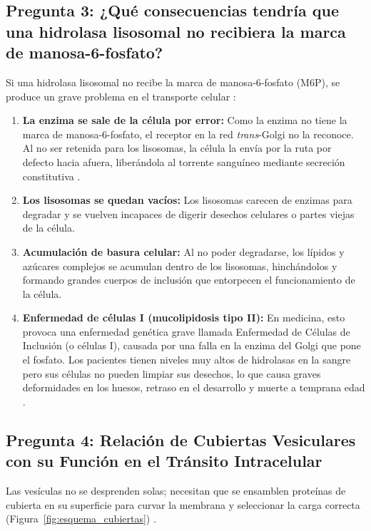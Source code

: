\documentclass[spanish,letterpaper,oneside]{article}
\begin{document}
\subsection{Pregunta 3: ¿Qué consecuencias tendría que una hidrolasa lisosomal no recibiera la marca de manosa-6-fosfato?}
Si una hidrolasa lisosomal no recibe la marca de manosa-6-fosfato (M6P), se produce un grave problema en el transporte celular \parencite{lieberman2018marks, karp2019biologia}:
\begin{enumerate}
    \item \textbf{La enzima se sale de la célula por error:} Como la enzima no tiene la marca de manosa-6-fosfato, el receptor en la red \textit{trans}-Golgi no la reconoce. Al no ser retenida para los lisosomas, la célula la envía por la ruta por defecto hacia afuera, liberándola al torrente sanguíneo mediante secreción constitutiva \parencite{alberts2022molecular, lodish2021molecular}.
    \item \textbf{Los lisosomas se quedan vacíos:} Los lisosomas carecen de enzimas para degradar y se vuelven incapaces de digerir desechos celulares o partes viejas de la célula.
    \item \textbf{Acumulación de basura celular:} Al no poder degradarse, los lípidos y azúcares complejos se acumulan dentro de los lisosomas, hinchándolos y formando grandes cuerpos de inclusión que entorpecen el funcionamiento de la célula.
    \item \textbf{Enfermedad de células I (mucolipidosis tipo II):} En medicina, esto provoca una enfermedad genética grave llamada Enfermedad de Células de Inclusión (o células I), causada por una falla en la enzima del Golgi que pone el fosfato. Los pacientes tienen niveles muy altos de hidrolasas en la sangre pero sus células no pueden limpiar sus desechos, lo que causa graves deformidades en los huesos, retraso en el desarrollo y muerte a temprana edad \parencite{lieberman2018marks, kierszenbaum2020histologia}.
\end{enumerate}

\subsection{Pregunta 4: Relación de Cubiertas Vesiculares con su Función en el Tránsito Intracelular}
Las vesículas no se desprenden solas; necesitan que se ensamblen proteínas de cubierta en su superficie para curvar la membrana y seleccionar la carga correcta (Figura~\ref{fig:esquema_cubiertas}) \parencite{alberts2022molecular, lodish2021molecular}.
\end{document}
